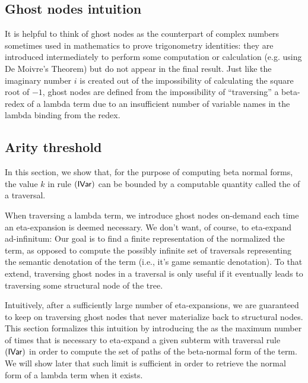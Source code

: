 \documentclass{article}
\theoremstyle{definition}
\begin{document}
\subsection{Ghost nodes intuition}

It is helpful to think of ghost nodes as the counterpart of complex numbers sometimes used in mathematics
to prove trigonometry identities: they are introduced intermediately to perform some computation or calculation (e.g. using De Moivre's Theorem) but do not appear in the final result. Just like the imaginary number $i$ is created out of the impossibility of calculating the square root of $-1$, ghost nodes are defined from the impossibility of ``traversing'' a beta-redex of a lambda term due to an insufficient number of variable names in the lambda binding from the redex.

\subsection{Arity threshold}

In this section, we show that, for the purpose of computing beta normal forms, the value $k$ in rule $\mathbf{({\sf IVar})}$ can be bounded by a computable quantity called the  of a traversal.

When traversing a lambda term, we introduce ghost nodes on-demand each time an eta-expansion is deemed necessary.
We don't want, of course, to eta-expand ad-infinitum: Our goal is to find a finite representation of the normalized the term, as opposed to compute the possibly infinite set of traversals representing the semantic denotation of the term (i.e., it's game semantic denotation). To that extend, traversing ghost nodes in a traversal is only useful if it eventually leads to traversing some structural node of the tree.

Intuitively, after a sufficiently large number of eta-expansions, we are guaranteed to keep on traversing ghost nodes that never materialize back to structural nodes. This section formalizes this intuition by introducing the  as the maximum number of times that is necessary to eta-expand a given subterm with traversal rule $\mathbf{({\sf IVar})}$ in order to compute the set of paths of the beta-normal form of the term. We will show later that such limit is sufficient in order to retrieve the normal form of a lambda term when it exists.
\end{document}
